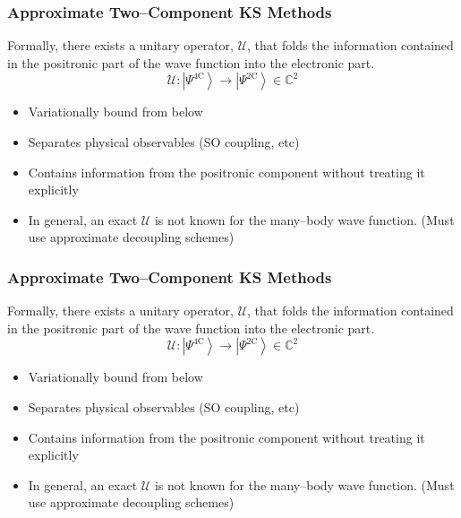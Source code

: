 \documentclass{beamer}
\newcommand{\ket}[1]{\left \vert #1 \right \rangle}
\begin{document}
\begin{frame}
\frametitle{Approximate Two--Component KS Methods}

Formally, there exists a unitary operator, $\mathcal{U}$, that folds the information
contained in the positronic part of the wave function into the electronic part.
\begin{equation*}
\mathcal{U} : \ket{\Psi^\mathrm{4C}} \rightarrow \ket{\Psi^\mathrm{2C}} \in \mathbb{C}^2
\end{equation*}

\begin{itemize}
  \color{green}
  \item Variationally bound from below
  \item Separates physical observables (SO coupling, etc)
  \color{white}
  \item[\color{white}] Contains information from the positronic component without treating it explicitly
\end{itemize}

\begin{itemize}
  \color{white}
  \item[\color{white}] In general, an exact $\mathcal{U}$ is not known for the many--body wave function.
  (Must use approximate decoupling schemes)
\end{itemize}

\end{frame}

\begin{frame}
\frametitle{Approximate Two--Component KS Methods}

Formally, there exists a unitary operator, $\mathcal{U}$, that folds the information
contained in the positronic part of the wave function into the electronic part.
\begin{equation*}
\mathcal{U} : \ket{\Psi^\mathrm{4C}} \rightarrow \ket{\Psi^\mathrm{2C}} \in \mathbb{C}^2
\end{equation*}

\begin{itemize}
  \color{green}
  \item Variationally bound from below
  \item Separates physical observables (SO coupling, etc)
  \item Contains information from the positronic component without treating it explicitly
\end{itemize}

\begin{itemize}
  \color{white}
  \item[\color{white}] In general, an exact $\mathcal{U}$ is not known for the many--body wave function.
  (Must use approximate decoupling schemes)
\end{itemize}

\end{frame}
\end{document}
